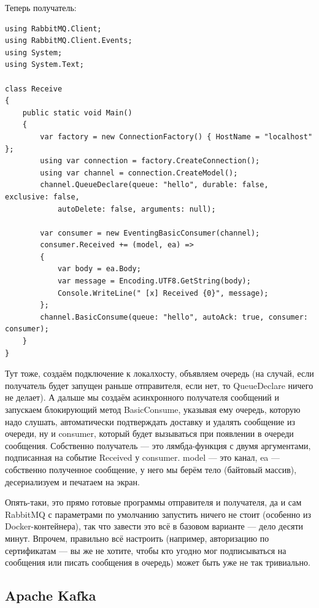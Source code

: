 \documentclass{../../text-style}
\begin{document}
Теперь получатель:

\begin{verbatim}
using RabbitMQ.Client;
using RabbitMQ.Client.Events;
using System;
using System.Text;

class Receive
{
    public static void Main()
    {
        var factory = new ConnectionFactory() { HostName = "localhost" };
        using var connection = factory.CreateConnection();
        using var channel = connection.CreateModel();
        channel.QueueDeclare(queue: "hello", durable: false, exclusive: false, 
            autoDelete: false, arguments: null);

        var consumer = new EventingBasicConsumer(channel);
        consumer.Received += (model, ea) =>
        {
            var body = ea.Body;
            var message = Encoding.UTF8.GetString(body);
            Console.WriteLine(" [x] Received {0}", message);
        };
        channel.BasicConsume(queue: "hello", autoAck: true, consumer: consumer);
    }
}
\end{verbatim}

Тут тоже, создаём подключение к локалхосту, объявляем очередь (на случай, если получатель будет запущен раньше отправителя, если нет, то QueueDeclare ничего не делает). А дальше мы создаём асинхронного получателя сообщений и запускаем блокирующий метод BasicConsume, указывая ему очередь, которую надо слушать, автоматически подтверждать доставку и удалять сообщение из очереди, ну и consumer, который будет вызываться при появлении в очереди сообщения. Собственно получатель --- это лямбда-функция с двумя аргументами, подписанная на событие Received у consumer. model --- это канал, ea --- собственно полученное сообщение, у него мы берём тело (байтовый массив), десериализуем и печатаем на экран.

Опять-таки, это прямо готовые программы отправителя и получателя, да и сам RabbitMQ с параметрами по умолчанию запустить ничего не стоит (особенно из Docker-контейнера), так что завести это всё в базовом варианте --- дело десяти минут. Впрочем, правильно всё настроить (например, авторизацию по сертификатам --- вы же не хотите, чтобы кто угодно мог подписываться на сообщения или писать сообщения в очередь) может быть уже не так тривиально.

\subsection{Apache Kafka}
\end{document}
